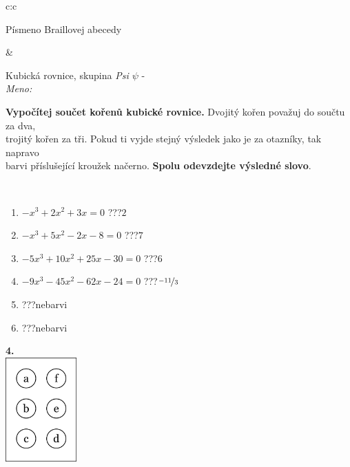\documentclass[10pt]{report}
\begin{document}
\begin{tabular}{c:c}
\begin{minipage}[c][104.5mm][t]{0.5\linewidth}
\begin{center}
\begin{minipage}{0.20\linewidth}
\begin{center}
{\small Písmeno Braillovej abecedy}
\end{center}
\end{minipage}
\end{center}
\end{minipage}
&
\begin{minipage}[c][104.5mm][t]{0.5\linewidth}
\begin{center}
\vspace{7mm}
{\huge Kubická rovnice, skupina \textit{Psi $\psi$} -}\\[5mm]
\textit{Meno:}\phantom{xxxxxxxxxxxxxxxxxxxxxxxxxxxxxxxxxxxxxxxxxxxxxxxxxxxxxxxxxxxxxxxxx}\\[5mm]
\begin{minipage}{0.95\linewidth}
\textbf{Vypočítej součet kořenů kubické rovnice.} Dvojitý kořen považuj do součtu za dva,\\trojitý kořen za tři. Pokud ti vyjde stejný výsledek jako je za otazníky, tak napravo\\barvi příslušející kroužek načerno. \textbf{Spolu odevzdejte výsledné slovo}.
\end{minipage}
\\[1mm]
\begin{minipage}{0.79\linewidth}
\begin{center}
\begin{varwidth}{\linewidth}
\begin{enumerate}
\Large
\item $-x^3+2x^2+3x=0$\quad \dotfill\; ???\;\dotfill \quad $2$
\item $-x^3+5x^2-2x-8=0$\quad \dotfill\; ???\;\dotfill \quad $7$
\item $-5x^3+10x^2+25x-30=0$\quad \dotfill\; ???\;\dotfill \quad $6$
\item $-9x^3-45x^2-62x-24=0$\quad \dotfill\; ???\;\dotfill \quad $\nicefrac{-11}{3}$
\item \quad \dotfill\; ???\;\dotfill \quad nebarvi
\item \quad \dotfill\; ???\;\dotfill \quad nebarvi
\end{enumerate}
\end{varwidth}
\end{center}
\end{minipage}
\begin{minipage}{0.20\linewidth}
\begin{center}
{\Huge\bfseries 4.} \\[2mm]
\includegraphics[height=40mm]{../images/braille.png}

\end{center}
\end{minipage}
\end{center}
\end{minipage}
\end{tabular}
\end{document}
